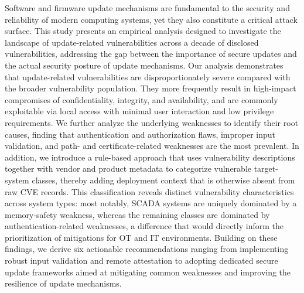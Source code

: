 \documentclass[fleqn,s1,names,tex]{neptune}
\begin{document}
Software and firmware update mechanisms are fundamental to the security and reliability of modern computing systems, yet they also constitute a critical attack surface. 
This study presents an empirical analysis designed to investigate the landscape of update-related vulnerabilities across a decade of disclosed vulnerabilities, addressing the gap between the importance of secure updates and the actual security posture of update mechanisms.
Our analysis demonstrates that update-related vulnerabilities are disproportionately severe compared with the broader vulnerability population. 
They more frequently result in high-impact compromises of confidentiality, integrity, and availability, and are commonly exploitable via local access with minimal user interaction and low privilege requirements. 
We further analyze the underlying weaknesses to identify their root causes, finding that authentication and authorization flaws, improper input validation, and path- and certificate-related weaknesses are the most prevalent. 
In addition, we introduce a rule-based approach that uses vulnerability descriptions together with vendor and product metadata to categorize vulnerable target-system classes, thereby adding deployment context that is otherwise absent from raw CVE records. 
This classification reveals distinct vulnerability characteristics across system types: most notably, SCADA systems are uniquely dominated by a memory-safety weakness, whereas the remaining classes are dominated by authentication-related weaknesses, a difference that would directly inform the prioritization of mitigations for OT and IT environments. 
Building on these findings, we derive six actionable recommendations ranging from implementing robust input validation and remote attestation to adopting dedicated secure update frameworks aimed at mitigating common weaknesses and improving the resilience of update mechanisms.


\printauthorcredits

\conflictofinterest


\end{document}
